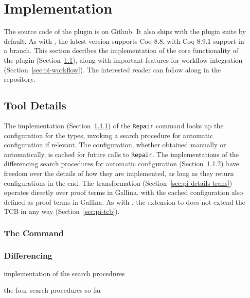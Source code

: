 \section{Implementation}
\label{sec:pi-implementation}

The source code of the \toolnamec plugin is on Github.
It also ships with the \sysnamelong plugin suite by default.
As with \sysname, the latest version supports Coq 8.8, with Coq 8.9.1 support in a branch.
This section decribes the implementation of the core functionality of the \toolnamec plugin (Section~\ref{sec:pi-details}),
along with important features for workflow integration (Section~\ref{sec:pi-workflow}).
The interested reader can follow along in the repository.

\subsection{Tool Details}
\label{sec:pi-details}

The implementation (Section~\ref{sec:pi-details-command}) of the \lstinline{Repair} command
looks up the configuration for the types, invoking a search procedure for automatic configuration if relevant.
The configuration, whether obtained manually or automatically, is cached for future calls to \lstinline{Repair}.
The implementations of the differencing search procedures for automatic configuration (Section~\ref{sec:pi-details-diff})
have freedom over the details of how they are implemented, as long as they return configurations in the end.
The transformation (Section~\ref{sec:pi-details-trans}) operates directly over proof terms in Gallina, with the cached configuration
also defined as proof terms in Gallina.
As with \sysname, the \toolnamec extension to \sysnamelong does not extend the TCB in any way (Section~\ref{sec:pi-tcb}).

\subsubsection{The Command}
\label{sec:pi-details-command}

\subsubsection{Differencing}
\label{sec:pi-details-diff}

implementation of the search procedures

the four search procedures so far


